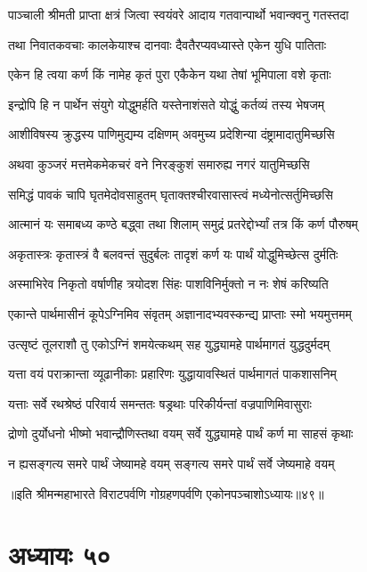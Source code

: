 \twolineshloka
{पाञ्चाली श्रीमती प्राप्ता क्षत्रं जित्वा स्वयंवरे}
{आदाय गतवान्पार्थो भवान्क्वनु गतस्तदा}


\twolineshloka
{तथा निवातकवचाः कालकेयाश्च दानवाः}
{दैवतैरप्यवध्यास्ते एकेन युधि पातिताः}


\twolineshloka
{एकेन हि त्वया कर्ण किं नामेह कृतं पुरा}
{एकैकेन यथा तेषां भूमिपाला वशे कृताः}


\twolineshloka
{इन्द्रोपि हि न पार्थेन संयुगे योद्धुमर्हति}
{यस्तेनाशंसते योद्धुं कर्तव्यं तस्य भेषजम्}


\twolineshloka
{आशीविषस्य क्रुद्धस्य पाणिमुद्यम्य दक्षिणम्}
{अवमुच्य प्रदेशिन्या दंष्ट्रामादातुमिच्छसि}


\twolineshloka
{अथवा कुञ्जरं मत्तमेकमेकचरं वने}
{निरङ्कुशं समारुह्य नगरं यातुमिच्छसि}


\twolineshloka
{समिद्धं पावकं चापि घृतमेदोवसाहुतम्}
{घृताक्तश्चीरवासास्त्वं मध्येनोत्सर्तुमिच्छसि}


\twolineshloka
{आत्मानं यः समाबध्य कण्ठे बद्ध्वा तथा शिलाम्}
{समुद्रं प्रतरेद्दोर्भ्यां तत्र किं कर्ण पौरुषम्}


\twolineshloka
{अकृतास्त्रः कृतास्त्रं वै बलवन्तं सुदुर्बलः}
{तादृशं कर्ण यः पार्थं योद्धुमिच्छेत्स दुर्मतिः}


\twolineshloka
{अस्माभिरेव निकृतो वर्षाणीह त्रयोदश}
{सिंहः पाशविनिर्मुक्तो न नः शेषं करिष्यति}


\twolineshloka
{एकान्ते पार्थमासीनं कूपेऽग्निमिव संवृतम्}
{अज्ञानादभ्यवस्कन्द्य प्राप्ताः स्मो भयमुत्तमम्}


\twolineshloka
{उत्सृष्टं तूलराशौ तु एकोऽग्निं शमयेत्कथम्}
{सह युद्ध्यामहे पार्थमागतं युद्धदुर्मदम्}


\twolineshloka
{यत्ता वयं पराक्रान्ता व्यूढानीकाः प्रहारिणः}
{युद्धायावस्थितं पार्थमागतं पाकशासनिम्}


\twolineshloka
{यत्ताः सर्वे रथश्रेष्ठं परिवार्य समन्ततः}
{षड्रथाः परिकीर्यन्तां वज्रपाणिमिवासुराः}


\twolineshloka
{द्रोणो दुर्योधनो भीष्मो भवान्द्रौणिस्तथा वयम्}
{सर्वे युद्ध्यामहे पार्थं कर्ण मा साहसं कृथाः}


\twolineshloka
{न ह्यसङ्गत्य समरे पार्थं जेष्यामहे वयम्}
{सङ्गत्य समरे पार्थं सर्वे जेष्यमाहे वयम्}

॥इति श्रीमन्महाभारते विराटपर्वणि गोग्रहणपर्वणि एकोनपञ्चाशोऽध्यायः॥४९॥

\chapter{अध्यायः ५०}

